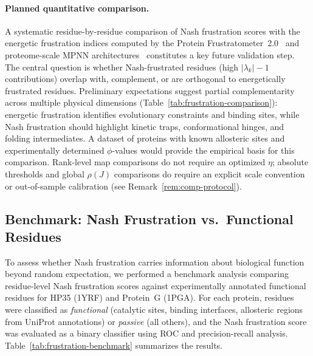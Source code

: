 \documentclass[12pt,a4paper]{article}
\theoremstyle{remark}
\begin{document}
\paragraph{Planned quantitative comparison.}
A systematic residue-by-residue comparison of Nash frustration scores with the energetic frustration indices computed by the Protein Frustratometer~2.0~\citep{ParraFerreiro2016} and proteome-scale MPNN architectures~\citep{Beining2026,Leusch2026} constitutes a key future validation step. The central question is whether Nash-frustrated residues (high $|\lambda_k|-1$ contributions) overlap with, complement, or are orthogonal to energetically frustrated residues. Preliminary expectations suggest partial complementarity across multiple physical dimensions (Table~\ref{tab:frustration-comparison}): energetic frustration identifies evolutionary constraints and binding sites, while Nash frustration should highlight kinetic traps, conformational hinges, and folding intermediates. A dataset of proteins with known allosteric sites and experimentally determined $\phi$-values would provide the empirical basis for this comparison. Rank-level map comparisons do not require an optimized $\eta$; absolute thresholds and global $\rho(J)$ comparisons do require an explicit scale convention or out-of-sample calibration (see Remark~\ref{rem:comp-protocol}).

\subsection{Benchmark: Nash Frustration vs.\ Functional Residues}
\label{sec:frustration-benchmark}

To assess whether Nash frustration carries information about biological function beyond random expectation, we performed a benchmark analysis comparing residue-level Nash frustration scores against experimentally annotated functional residues for HP35 (1YRF) and Protein~G (1PGA). For each protein, residues were classified as \emph{functional} (catalytic sites, binding interfaces, allosteric regions from UniProt annotations) or \emph{passive} (all others), and the Nash frustration score was evaluated as a binary classifier using ROC and precision-recall analysis. Table~\ref{tab:frustration-benchmark} summarizes the results.
\end{document}
